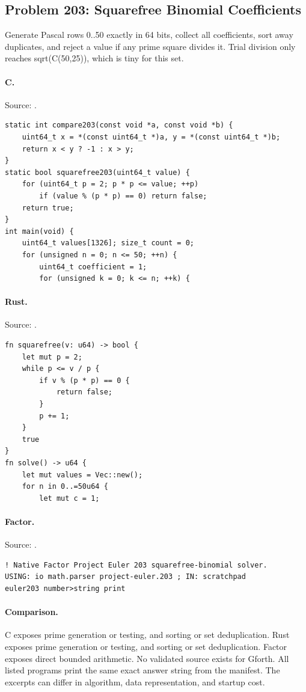 \subsection{Problem 203: Squarefree Binomial Coefficients}
\label{walkthrough:p203}
Generate Pascal rows 0..50 exactly in 64 bits, collect all coefficients, sort away duplicates, and reject a value if any prime square divides it. Trial division only reaches sqrt(C(50,25)), which is tiny for this set.

\paragraph{C.} Source: .
\begin{lstlisting}
static int compare203(const void *a, const void *b) {
    uint64_t x = *(const uint64_t *)a, y = *(const uint64_t *)b;
    return x < y ? -1 : x > y;
}
static bool squarefree203(uint64_t value) {
    for (uint64_t p = 2; p * p <= value; ++p)
        if (value % (p * p) == 0) return false;
    return true;
}
int main(void) {
    uint64_t values[1326]; size_t count = 0;
    for (unsigned n = 0; n <= 50; ++n) {
        uint64_t coefficient = 1;
        for (unsigned k = 0; k <= n; ++k) {
\end{lstlisting}

\paragraph{Rust.} Source: .
\begin{lstlisting}
fn squarefree(v: u64) -> bool {
    let mut p = 2;
    while p <= v / p {
        if v % (p * p) == 0 {
            return false;
        }
        p += 1;
    }
    true
}
fn solve() -> u64 {
    let mut values = Vec::new();
    for n in 0..=50u64 {
        let mut c = 1;
\end{lstlisting}

\paragraph{Factor.} Source: .
\begin{lstlisting}
! Native Factor Project Euler 203 squarefree-binomial solver.
USING: io math.parser project-euler.203 ; IN: scratchpad
euler203 number>string print
\end{lstlisting}

\paragraph{Comparison.}
C exposes prime generation or testing, and sorting or set deduplication. Rust exposes prime generation or testing, and sorting or set deduplication. Factor exposes direct bounded arithmetic.
No validated source exists for Gforth.
All listed programs print the same exact answer string from the manifest. The excerpts can differ in algorithm, data representation, and startup cost.

